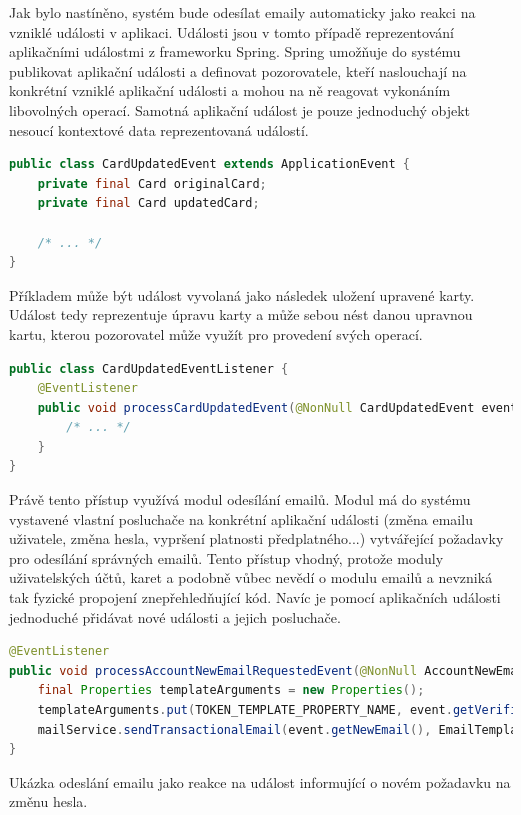 		Jak bylo nastíněno, systém bude odesílat emaily automaticky jako reakci na vzniklé události v aplikaci.
		Události jsou v tomto případě reprezentování aplikačními událostmi z frameworku Spring.
		Spring umožňuje do systému publikovat aplikační události a definovat pozorovatele, kteří naslouchají na konkrétní
		vzniklé aplikační události a mohou na ně reagovat vykonáním libovolných operací.
		Samotná aplikační událost je pouze jednoduchý objekt nesoucí kontextové data reprezentovaná událostí.

		\begin{lstlisting}[language=Java]
public class CardUpdatedEvent extends ApplicationEvent {
    private final Card originalCard;
    private final Card updatedCard;

    /* ... */
}
		\end{lstlisting}

		Příkladem může být událost vyvolaná jako následek uložení upravené karty.
		Událost tedy reprezentuje úpravu karty a může sebou nést danou upravnou kartu, kterou pozorovatel může
		využít pro provedení svých operací.
		\begin{lstlisting}[language=Java]
public class CardUpdatedEventListener {
    @EventListener
    public void processCardUpdatedEvent(@NonNull CardUpdatedEvent event) {
        /* ... */
    }
}
		\end{lstlisting}

		Právě tento přístup využívá modul odesílání emailů.
		Modul má do systému vystavené vlastní posluchače na konkrétní aplikační události (změna emailu uživatele, změna hesla,
		vypršení platnosti předplatného...) vytvářející požadavky pro odesílání správných emailů.
		Tento přístup vhodný, protože moduly uživatelských účtů, karet a podobně vůbec nevědí o modulu emailů a nevzniká
		tak fyzické propojení znepřehledňující kód.
		Navíc je pomocí aplikačních události jednoduché přidávat nové události a jejich posluchače.

		\begin{lstlisting}[language=Java]
@EventListener
public void processAccountNewEmailRequestedEvent(@NonNull AccountNewEmailRequestedEvent event) {
	final Properties templateArguments = new Properties();
	templateArguments.put(TOKEN_TEMPLATE_PROPERTY_NAME, event.getVerificationToken().getToken());
	mailService.sendTransactionalEmail(event.getNewEmail(), EmailTemplate.ACCOUNT_NEW_EMAIL, templateArguments);
}
		\end{lstlisting}
		Ukázka odeslání emailu jako reakce na událost informující o novém požadavku na změnu hesla. %

